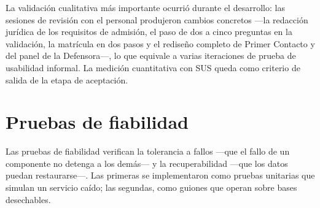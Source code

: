 	La validación cualitativa más importante ocurrió durante el desarrollo: las sesiones de revisión con
	el personal produjeron cambios concretos ---la redacción jurídica de los requisitos de admisión, el
	paso de dos a cinco preguntas en la validación, la matrícula en dos pasos y el rediseño completo de
	Primer Contacto y del panel de la Defensora---, lo que equivale a varias iteraciones de prueba de
	usabilidad informal. La medición cuantitativa con SUS queda como criterio de salida de la etapa de
	aceptación.

	\section{Pruebas de fiabilidad}
	\label{sec:pruebas_fiabilidad}
	Las pruebas de fiabilidad verifican la tolerancia a fallos ---que el fallo de un componente no
	detenga a los demás--- y la recuperabilidad ---que los datos puedan restaurarse---. Las primeras se
	implementaron como pruebas unitarias que simulan un servicio caído; las segundas, como guiones que
	operan sobre bases desechables.

